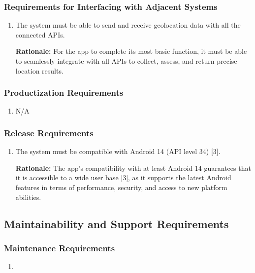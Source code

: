 \documentclass[]{article}
\begin{document}
\subsubsection{Requirements for Interfacing with Adjacent Systems}
\label{ssub:requirements_for_interfacing_with_adjacent_systems}
\begin{enumerate}[{OE-IA}1. ]
	\item The system must be able to send and receive geolocation data with all the connected APIs.
	
	{\bf Rationale:} For the app to complete its most basic function, it must be able to seamlessly integrate with all APIs to collect, assess, and return precise location results.
\end{enumerate}

\subsubsection{Productization Requirements}
\label{ssub:productization_requirements}
\begin{enumerate}[{OE-P}1. ]
	\item N/A
\end{enumerate}

\subsubsection{Release Requirements}
\label{ssub:release_requirements}
\begin{enumerate}[{OE-R}1. ]
	\item The system must be compatible with Android 14 (API level 34) [3].
	
	{\bf Rationale:} The app’s compatibility with at least Android 14 guarantees that it is accessible to a wide user base [3], as it supports the latest Android features in terms of performance, security, and access to new platform abilities.
\end{enumerate}


\subsection{Maintainability and Support Requirements}
\label{sub:maintainability_and_support_requirements}

\subsubsection{Maintenance Requirements}
\label{ssub:maintenance_requirements}
\begin{enumerate}[{MS-M}1. ]
	\item 
\end{enumerate}
\end{document}

